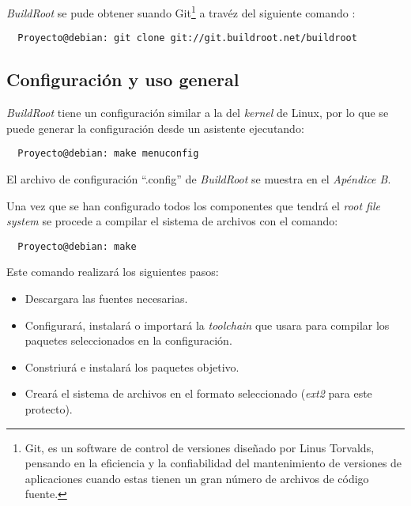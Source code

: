 \emph{BuildRoot} se pude obtener suando Git\footnote{Git, es un software de
control de versiones diseñado por Linus Torvalds, pensando en la eficiencia y la
confiabilidad del mantenimiento de versiones de aplicaciones cuando estas tienen
un gran número de archivos de código fuente.} a travéz del siguiente comando :
\begin{verbatim}
  Proyecto@debian: git clone git://git.buildroot.net/buildroot
\end{verbatim}

\subsection{Configuración y uso general}

\emph{BuildRoot} tiene un configuración similar a la del \emph{kernel} de
Linux, por lo que se puede generar la configuración desde un asistente
ejecutando:
\begin{verbatim}
  Proyecto@debian: make menuconfig
\end{verbatim}

El archivo de configuración ``.config'' de \emph{BuildRoot}  se muestra en el
\emph{Apéndice B}.

Una vez que se han configurado todos los componentes que tendrá el \emph{root
file system} se procede a compilar el sistema de archivos con el comando:
\begin{verbatim}
  Proyecto@debian: make 
\end{verbatim}

Este comando realizará los siguientes pasos:
\begin{itemize}
 \item Descargara las fuentes necesarias.
 \item Configurará, instalará o importará la \emph{toolchain} que usara para
compilar los paquetes seleccionados en la configuración.
 \item Constriurá e instalará los paquetes objetivo.
 \item Creará el sistema de archivos en el formato seleccionado (\emph{ext2}
para este protecto).
\end{itemize}

